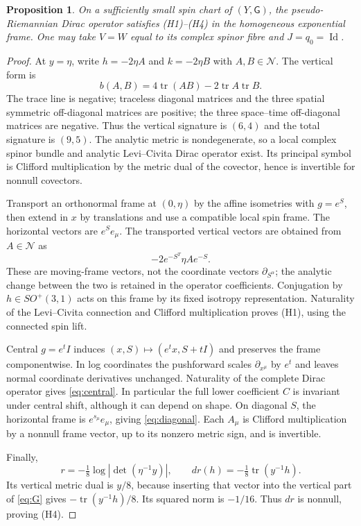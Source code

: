 \documentclass[11pt]{article}
\newtheorem{proposition}[theorem]{Proposition}
\theoremstyle{definition}\newtheorem{definition}[theorem]{Definition}
\theoremstyle{remark}\newtheorem{remark}[theorem]{Remark}
\DeclareMathOperator{\tr}{tr}
\DeclareMathOperator{\Id}{Id}
\newcommand{\Ncal}{\mathcal N}\newcommand{\Hobs}{\mathcal H}
\begin{document}
\begin{proposition}\label{prop:dirac}
On a sufficiently small spin chart of $(Y,\mathsf G)$, the pseudo-Riemannian Dirac operator satisfies (H1)--(H4) in the homogeneous exponential frame. One may take $V=W$ equal to its complex spinor fibre and $J=q_0=\Id$.
\end{proposition}
\begin{proof}
At $y=\eta$, write $h=-2\eta A$ and $k=-2\eta B$ with $A,B\in\Ncal$. The vertical form is
\[
 b(A,B)=4\tr(AB)-2\tr A\tr B.
\]
The trace line is negative; traceless diagonal matrices and the three spatial symmetric off-diagonal matrices are positive; the three space--time off-diagonal matrices are negative. Thus the vertical signature is $(6,4)$ and the total signature is $(9,5)$. The analytic metric is nondegenerate, so a local complex spinor bundle and analytic Levi--Civita Dirac operator exist. Its principal symbol is Clifford multiplication by the metric dual of the covector, hence is invertible for nonnull covectors.

Transport an orthonormal frame at $(0,\eta)$ by the affine isometries with $g=e^S$, then extend in $x$ by translations and use a compatible local spin frame. The horizontal vectors are $e^Se_\mu$. The transported vertical vectors are obtained from $A\in\Ncal$ as
\[
 -2e^{-S^T}\eta A e^{-S}.
\]
These are moving-frame vectors, not the coordinate vectors $\partial_{S^\alpha}$; the analytic change between the two is retained in the operator coefficients. Conjugation by $h\in SO^+(3,1)$ acts on this frame by its fixed isotropy representation. Naturality of the Levi--Civita connection and Clifford multiplication proves (H1), using the connected spin lift.

Central $g=e^tI$ induces $(x,S)\mapsto(e^t x,S+tI)$ and preserves the frame componentwise. In log coordinates the pushforward scales $\partial_{x^\mu}$ by $e^t$ and leaves normal coordinate derivatives unchanged. Naturality of the complete Dirac operator gives \eqref{eq:central}. In particular the full lower coefficient $C$ is invariant under central shift, although it can depend on shape. On diagonal $S$, the horizontal frame is $e^{s_\mu}e_\mu$, giving \eqref{eq:diagonal}. Each $A_\mu$ is Clifford multiplication by a nonnull frame vector, up to its nonzero metric sign, and is invertible.

Finally,
\[
 r=-\tfrac18\log|\det(\eta^{-1}y)|,
 \qquad dr(h)=-\tfrac18\tr(y^{-1}h).
\]
Its vertical metric dual is $y/8$, because inserting that vector into the vertical part of \eqref{eq:G} gives $-\tr(y^{-1}h)/8$. Its squared norm is $-1/16$. Thus $dr$ is nonnull, proving (H4).
\end{proof}
\end{document}
